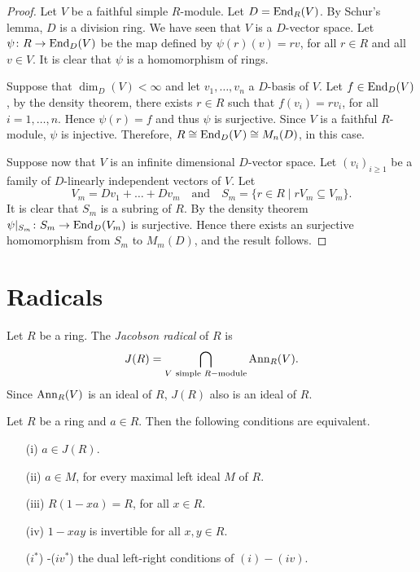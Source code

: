 \begin{proof}
Let $V$ be a faithful simple $R$-module.
Let $D=\operatorname{End}_R(V)$. By Schur's lemma, $D$ is a division ring.
We have seen that $V$ is a $D$-vector space.
Let $\psi\colon R\rightarrow\operatorname{End}_D(V)$ be the map defined by $\psi
(r)(v)=rv$, for all $r\in R$ and all $v\in V$. It is clear that $\psi$ is a homomorphism of rings.

Suppose that $\dim_D(V)<\infty$ and let $v_1,\dots,v_n$ a
$D$-basis of $V$. Let $f\in \operatorname{End}_D(V)$, by the density theorem, there exists $r\in R$ such that $f(v_i)=rv_i$, for all
$i=1,\dots,n$. Hence $\psi (r)=f$ and thus $\psi$ is surjective. Since
$V$ is a faithful $R$-module, $\psi$ is injective. Therefore, $R\cong \operatorname{End}_D(V)\cong M_n(D)$, in this case.

Suppose now that $V$ is an infinite dimensional $D$-vector space. Let $(
v_i) _{i\geq 1}$ be a family of $D$-linearly independent vectors of $V$. Let
$$V_m=Dv_1+\dots+Dv_m\quad\mbox{and}\quad S_m=\{ r\in R\mid rV_m\subseteq
V_m\} .$$
It is clear that $S_m$ is a subring of $R$. By the density theorem $\psi |_{S_m}\colon S_m\rightarrow \operatorname{End}_D(V_m)$ is surjective. 
Hence there exists an surjective homomorphism from $S_m$ to $M_m(D)$, and the result follows.
\end{proof}

\section*{Radicals}

Let $R$ be a ring. The {\em Jacobson radical} of $R$ is
$$J(R)=\bigcap_{V \mbox{ \scriptsize{simple} }R-\mbox{\scriptsize{module}}} \operatorname{Ann}_R(V).$$
Since $\operatorname{Ann}_R(V)$ is an ideal of $R$, $J(R)$ also is an ideal of $R$.

\begin{theorem}[Jacobson]\label{Teorema 1.3.1}
Let $R$ be a ring and $a\in R$. Then the following conditions are equivalent.
\begin{itemize}\item[(i)] $a\in J(R)$.
\item[(ii)] $a\in  M$, for every maximal left ideal $M$ of $R$.
\item[(iii)] $R(1-xa)=R$, for all $x\in R$.
\item[(iv)] $1-xay$ is invertible for all $x,y\in R$.
\item[($i^*$)]-($iv^*$) the dual left-right conditions of $(i)-(iv)$.
\end{itemize}
\end{theorem}

